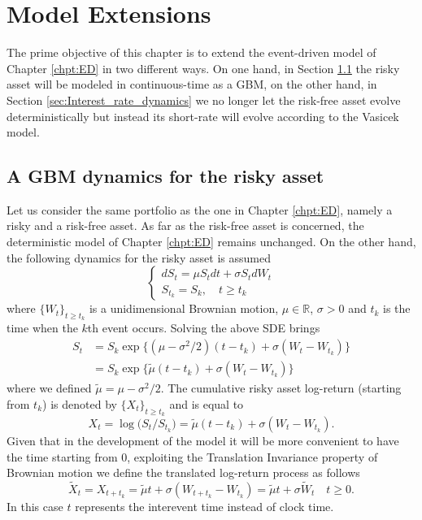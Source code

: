\chapter{Model Extensions}\label{chpt:Model_Extensions}
The prime objective of this chapter is to extend the event-driven model of Chapter \ref{chpt:ED} in two different ways. On one hand, in Section \ref{sec:GBM} the risky asset will be modeled in continuous-time as a \gls{GBM}, on the other hand, in Section \ref{sec:Interest_rate_dynamics} we no longer let the risk-free asset evolve deterministically but instead its short-rate will evolve according to the Vasicek model. 
\section{A GBM dynamics for the risky asset}\label{sec:GBM}
Let us consider the same portfolio as the one in Chapter \ref{chpt:ED}, namely a risky and a risk-free asset. As far as the risk-free asset is concerned, the deterministic model of Chapter \ref{chpt:ED} remains unchanged. On the other hand, the following dynamics for the risky asset is assumed
\begin{equation}\label{eq:GBM_SDE}
\begin{cases*}
dS_t  = \mu S_t dt + \sigma S_t dW_t\\
S_{t_k} = S_k, \quad t\geq t_k
\end{cases*}
\end{equation}
where $\{W_t\}_{t\geq t_k}$ is a unidimensional Brownian motion, $\mu \in \mathbb{R}$, $\sigma > 0$ and $t_k$ is the time when the $k$th event occurs. Solving the above \gls{SDE} brings 
\begin{align*}
S_t & = S_k \exp\big\{(\mu-\sigma^2/2)(t-t_k)+\sigma(W_t-W_{t_k})\}\\
& = S_k \exp\big\{\widetilde{\mu}(t-t_k)+\sigma(W_t-W_{t_k})\}
\end{align*}
where we defined $\widetilde{\mu}= \mu-\sigma^2/2$. The cumulative risky asset log-return (starting from $t_k$) is denoted by $\{X_t\}_{t\geq t_k}$ and is equal to
\begin{equation}
X_t = \log\big(S_t/S_{t_k}\big)=\widetilde{\mu}(t-t_k) + \sigma(W_t-W_{t_k}).
\end{equation}
Given that in the development of the model it will be more convenient to have the time starting from 0, exploiting the Translation Invariance property of Brownian motion we define the translated log-return process as follows
\begin{equation}\label{eq:translatedGBM}
\widetilde{X}_t = X_{t+t_k} = \widetilde{\mu}t + \sigma(W_{t+t_k}-W_{t_k}) = \widetilde{\mu}t + \sigma \widetilde{W}_t \quad t\geq 0.
\end{equation}
In this case $t$ represents the interevent time instead of clock time.
